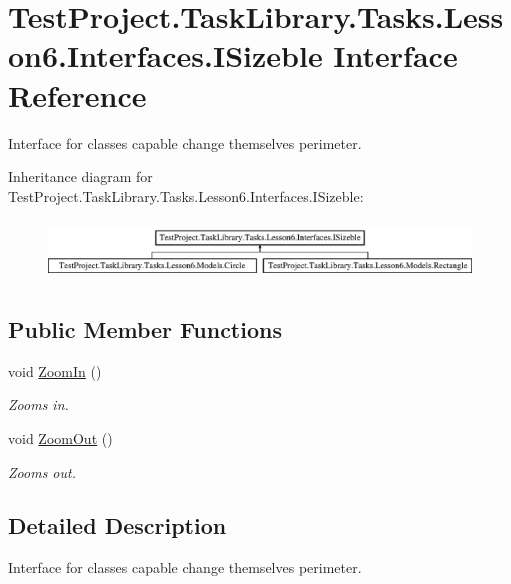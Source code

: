 \hypertarget{interface_test_project_1_1_task_library_1_1_tasks_1_1_lesson6_1_1_interfaces_1_1_i_sizeble}{}\section{Test\+Project.\+Task\+Library.\+Tasks.\+Lesson6.\+Interfaces.\+I\+Sizeble Interface Reference}
\label{interface_test_project_1_1_task_library_1_1_tasks_1_1_lesson6_1_1_interfaces_1_1_i_sizeble}


Interface for classes capable change themselves perimeter.  


Inheritance diagram for Test\+Project.\+Task\+Library.\+Tasks.\+Lesson6.\+Interfaces.\+I\+Sizeble\+:\begin{figure}[H]
\begin{center}
\leavevmode
\includegraphics[height=1.604584cm]{interface_test_project_1_1_task_library_1_1_tasks_1_1_lesson6_1_1_interfaces_1_1_i_sizeble}
\end{center}
\end{figure}
\subsection*{Public Member Functions}
\begin{DoxyCompactItemize}
\item 
void \mbox{\hyperlink{interface_test_project_1_1_task_library_1_1_tasks_1_1_lesson6_1_1_interfaces_1_1_i_sizeble_ada6181d54740d570d1575307c2574a0d}{Zoom\+In}} ()
\begin{DoxyCompactList}\small\item\em Zooms in. \end{DoxyCompactList}\item 
void \mbox{\hyperlink{interface_test_project_1_1_task_library_1_1_tasks_1_1_lesson6_1_1_interfaces_1_1_i_sizeble_ab4a49e0b6bbc4aa62f9ac1175b73e704}{Zoom\+Out}} ()
\begin{DoxyCompactList}\small\item\em Zooms out. \end{DoxyCompactList}\end{DoxyCompactItemize}


\subsection{Detailed Description}
Interface for classes capable change themselves perimeter. 



